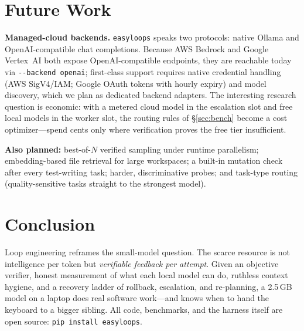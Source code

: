 \documentclass[11pt]{article}
\newcommand{\el}{\texttt{easyloops}}
\newcommand{\code}[1]{\texttt{#1}}
\begin{document}
\section{Future Work}

\textbf{Managed-cloud backends.} \el{} speaks two protocols: native Ollama and OpenAI-compatible
chat completions. Because AWS Bedrock and Google Vertex~AI both expose OpenAI-compatible
endpoints, they are reachable today via \code{-{}-backend openai}; first-class support requires
native credential handling (AWS SigV4/IAM; Google OAuth tokens with hourly expiry) and model
discovery, which we plan as dedicated backend adapters. The interesting research question is
economic: with a metered cloud model in the escalation slot and free local models in the worker
slot, the routing rules of \S\ref{sec:bench} become a cost optimizer---spend cents only where
verification proves the free tier insufficient.

\textbf{Also planned:} best-of-$N$ verified sampling under runtime parallelism; embedding-based
file retrieval for large workspaces; a built-in mutation check after every test-writing task;
harder, discriminative probes; and task-type routing (quality-sensitive tasks straight to the
strongest model).

\section{Conclusion}

Loop engineering reframes the small-model question. The scarce resource is not intelligence per
token but \emph{verifiable feedback per attempt}. Given an objective verifier, honest
measurement of what each local model can do, ruthless context hygiene, and a recovery ladder of
rollback, escalation, and re-planning, a 2.5\,GB model on a laptop does real software work---and
knows when to hand the keyboard to a bigger sibling. All code, benchmarks, and the harness
itself are open source: \code{pip install easyloops}.
\end{document}
